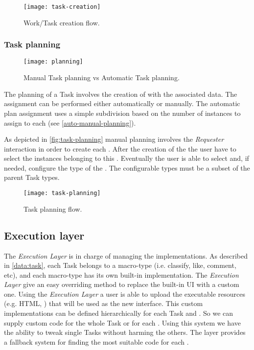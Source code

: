 \begin{figure}[htb]
    \centering
    \texttt{[image: task-creation]}
    \caption{Work/Task creation flow.}
    \label{fig:task-creation}
\end{figure}



\subsubsection{Task planning}
\begin{figure}[htb]
    \centering
    \texttt{[image: planning]}
    \caption{Manual Task planning vs Automatic Task planning.}
    \label{fig:auto-manual-planning}
\end{figure}
The planning of a Task involves the creation of \utask{} with the associated data.
The assignment can be performed either automatically or manually.
The automatic plan assignment uses a simple subdivision based on the
number of instances to assign to each \utask{} (see \autoref{auto-manual-planning}).

As depicted in \autoref{fig:task-planning} manual planning involves the
\emph{Requester} interaction in order to create each \textbf{\utask{}}.
After the creation of the \utask{} the user have to select the instances belonging
to this \utask{}. Eventually the user is able to select and, if needed,
configure the type of the \utask{}. The configurable types must be a subset of
the parent Task types.
\begin{figure}[htb]
    \centering
    \texttt{[image: task-planning]}
    \caption{Task planning flow.}
    \label{fig:task-planning}
\end{figure}










\subsection{Execution layer}\label{sec:exec-layer}
The \emph{Execution Layer} is in charge of managing the \utask{} implementations.
As described in \ref{data:task}, each Task belongs to a macro-type (i.e.
classify, like, comment, etc), and each macro-type  has its own built-in
implementation. The \emph{Execution Layer} give an easy overriding method to
replace the built-in UI with a custom one.
Using the \emph{Execution Layer} a user is able to upload the executable resources
(e.g. HTML, \js{}) that will be used as the new interface.
This custom implementations can be defined hierarchically for each Task
and \utask{}. So we can supply custom code for the whole Task or
for each \utask{}. Using this system we have the ability to tweak single
Tasks without harming the others. The layer provides a fallback
system for finding the most suitable code for each \utask{}.

